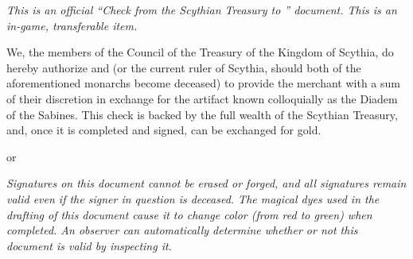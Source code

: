 \documentclass[white]{Kos}
\begin{document}
\name{\wScythiaCheck{}}

\emph{This is an official ``Check from the Scythian Treasury to \cMerchant{}'' document. This is an in-game, transferable item.}

We, the members of the Council of the Treasury of the Kingdom of Scythia, do hereby authorize \cScythiaKing{\Monarch} \cScythiaKing{} and \cScythiaQueen{\Monarch} \cScythiaQueen{}  (or the current ruler of Scythia, should both of the aforementioned monarchs become deceased) to provide the merchant \cMerchant {} with a sum of their discretion in exchange for the artifact known colloquially as the Diadem of the Sabines. This check is backed by the full wealth of the Scythian Treasury, and, once it is completed and signed, can be exchanged for gold.

\hrulefill

\cScythiaKing{\Monarch} \cScythiaKing{} or \cScythiaQueen{\Monarch} \cScythiaQueen{}

\hrulefill

\cMerchant{}

\emph{Signatures on this document cannot be erased or forged, and all signatures remain valid even if the signer in question is deceased. The magical dyes used in the drafting of this document cause it to change color (from red to green) when completed. An observer can automatically determine whether or not this document is valid by inspecting it.}
\end{document}
